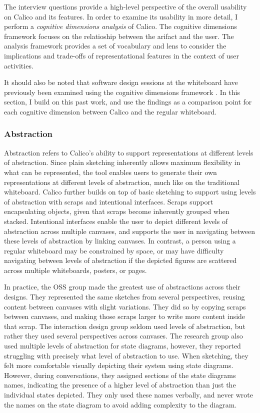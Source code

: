 The interview questions provide a high-level perspective of the overall usability on Calico and its features. In order to examine its usability in more detail, I perform a \textit{cognitive dimensions analysis} \cite{Green96usabilityanalysis} of Calico. The cognitive dimensions framework focuses on the relatioship between the arifact and the user. The analysis framework provides a set of vocabulary and lens to consider the implications and trade-offs of representational features in the context of user activities. 

It should also be noted that software design sessions at the whiteboard have previously been examined using the cognitive dimensions framework \citep{Petre2013BookChapter}. In this section, I build on this past work, and use the findings as a comparison point for each cognitive dimension between Calico and the regular whiteboard.

\subsubsection{Abstraction}
Abstraction refers to Calico's ability to support representations at different levels of abstraction. Since plain sketching inherently allows maximum flexibility in what can be represented, the tool enables users to generate their own representations at different levels of abstraction, much like on the traditional whiteboard. Calico further builds on top of basic sketching to support  using levels of abstraction with scraps and intentional interfaces. Scraps support encapsulating objects, given that scraps become inherently grouped when stacked. Intentional interfaces enable the user to depict different levels of abstraction across multiple canvases, and supports the user in navigating between these levels of abstraction by linking canvases. In contrast, a person using a regular whiteboard may be constrained by space, or may have difficulty navigating between levels of abstraction if the depicted figures are scattered across multiple whiteboards, posters, or pages. 

In practice, the OSS group made the greatest use of abstractions across their designs. They represented the same sketches from several perspectives, reusing content between canvases with slight variations. They did so by copying scraps between canvases, and making those scraps larger to write more content inside that scrap. The interaction design group seldom used levels of abstraction, but rather they used several perspectives across canvases. The research group also used multiple levels of abstraction for state diagrams, however, they reported struggling with precisely what level of abstraction to use. When sketching, they felt more comfortable visually depicting their system using state diagrams. However, during conversations, they assigned sections of the state diagrams names, indicating the presence of a higher level of abstraction than just the individual states depicted. They only used these names verbally, and never wrote the names on the state diagram to avoid adding complexity to the diagram.

